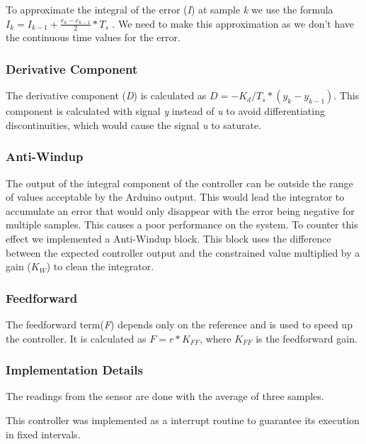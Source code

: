 To approximate the integral of the error (\emph{I}) at sample \emph{k} we use the formula $ I_k = I_{k-1} + \frac{e_k-e_{k-1}}{2} * T_s$ .
We need to make this approximation as we don't have the continuous time values for the error.

\subsubsection{Derivative Component}
\label{sub:Derivative Component}

The derivative component (\emph{D}) is calculated as $ D = - K_d/T_s * (y_{k}-y_{k-1})$.
This component is calculated with signal \emph{y} instead of \emph{u} to avoid differentiating discontinuities, which would cause the signal \emph{u} to saturate.

\subsubsection{Anti-Windup}
\label{sub:AntiWindup}

The output of the integral component of the controller can be outside the range of values acceptable by the Arduino output.
This would lead the integrator to accumulate an error that would only disappear with the error being negative for multiple samples.
This causes a poor performance on the system.
To counter this effect we implemented a Anti-Windup block.
This block uses the difference between the expected controller output and the constrained value multiplied by a gain ($K_W$) to clean the integrator.

\subsubsection{Feedforward}
\label{sub:Feedforward}

The feedforward term(\emph{F}) depends only on the reference and is used to speed up the controller. It is calculated as $F = r * K_{FF}$, where $K_{FF}$ is the feedforward gain.

\subsubsection{Implementation Details}
\label{sub:Implementation Details}

The readings from the sensor are done with the average of three samples.

This controller was implemented as a interrupt routine to guarantee its execution in fixed intervals.

